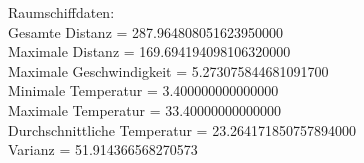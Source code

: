 \documentclass{minimal}
\begin{document}
Raumschiffdaten:
 \\Gesamte Distanz = 287.964808051623950000 \\ Maximale Distanz = 169.694194098106320000 \\ Maximale Geschwindigkeit = 5.273075844681091700 \\ Minimale Temperatur = 3.400000000000000 \\ Maximale Temperatur = 33.40000000000000 \\ Durchschnittliche Temperatur = 23.264171850757894000 \\ Varianz = 51.914366568270573
\end{document}
